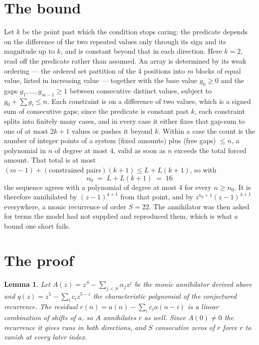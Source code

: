 \documentclass[11pt,a4paper]{article}
\theoremstyle{plain}
\newtheorem{lemma}[theorem]{Lemma}
\theoremstyle{definition}
\begin{document}
\section{The bound}

Let $k$ be the point past which the condition stops caring: the predicate depends on the
difference of the two repeated values only through its sign and its magnitude up to $k$, and is
constant beyond that in each direction. Here $k=2$, read off the predicate rather than
assumed. An array is determined by its weak ordering --- the ordered set partition of the
$4$ positions into $m$ blocks of equal value, listed in increasing value --- together with
the base value $g_0\ge0$ and the gaps $g_1,\dots,g_{m-1}\ge1$ between consecutive distinct
values, subject to $g_0+\sum g_i\le n$. Each constraint is on a difference of two values, which
is a signed sum of consecutive gaps; since the predicate is constant past $k$, each constraint
splits into finitely many cases, and in every case it either fixes that gap-sum to one of at
most $2k+1$ values or pushes it beyond $k$. Within a case the count is the number of integer
points of a system (fixed amounts) plus (free gaps) $\le n$, a polynomial in $n$ of degree at
most $4$, valid as soon as $n$ exceeds the total forced amount. That total is at most
$(m-1)+(\text{constrained pairs})(k+1)\le L+L(k+1)$, so with
\[
n_0 \;=\; L + L(k+1) \;=\; 16
\]
the sequence agrees with a polynomial of degree at most $4$ for every $n\ge n_0$. It is
therefore annihilated by $(z-1)^{4+1}$ from that point, and by $z^{n_0+1}(z-1)^{4+1}$
everywhere, a monic recurrence of order $S=22$. The annihilator was then asked for terms the
model had not supplied and reproduced them, which is what a bound one short fails.

\section{The proof}

\begin{lemma}\label{lem:crit}
Let $A(z)=z^S-\sum_{j<S}\alpha_jz^{j}$ be the monic annihilator derived above and
$q(z)=z^{5}-\sum_ic_iz^{5-i}$ the characteristic polynomial of the conjectured
recurrence. The residual $r(n)=a(n)-\sum_ic_ia(n-i)$ is a linear combination of shifts of $a$,
so $A$ annihilates $r$ as well. Since $A(0)\ne0$ the recurrence it gives runs in both
directions, and $S$ consecutive zeros of $r$ force $r$ to vanish at every later index.
\end{lemma}
\end{document}
